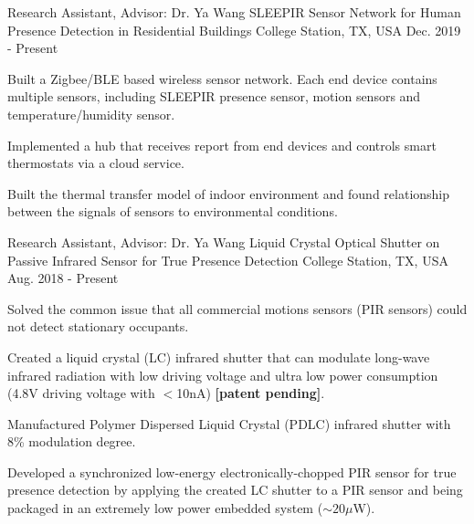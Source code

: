

\begin{cventries}

  \cventry
    {Research Assistant, Advisor: Dr. Ya Wang} %
    {SLEEPIR Sensor Network for Human Presence Detection in Residential Buildings} %
    {College Station, TX, USA} %
    {Dec. 2019 - Present} %
    {
      \begin{cvitems} %
        \item Built a Zigbee/BLE based wireless sensor network. Each end device contains multiple sensors, including SLEEPIR presence sensor, motion sensors and temperature/humidity sensor.
        \item Implemented a hub that receives report from end devices and controls smart thermostats via a cloud service.
        \item Built the thermal transfer model of indoor environment and found relationship between the signals of sensors to environmental conditions.
      \end{cvitems}
    }
  \cventry
    {Research Assistant, Advisor: Dr. Ya Wang} %
    {Liquid Crystal Optical Shutter on Passive Infrared Sensor for True Presence Detection} %
    {College Station, TX, USA} %
    {Aug. 2018 - Present} %
    {
      \begin{cvitems} %
        \item Solved the common issue that all commercial motions sensors (PIR sensors) could not detect stationary occupants.
        \item Created a liquid crystal (LC) infrared shutter that can modulate long-wave infrared radiation with low driving voltage and ultra low power consumption (4.8V driving voltage with $<$10nA) \textbf{[patent pending]}.
        \item Manufactured Polymer Dispersed Liquid Crystal (PDLC) infrared shutter with 8\% modulation degree.
        \item Developed a synchronized low-energy electronically-chopped PIR sensor for true presence detection by applying the created LC shutter to a PIR sensor and being packaged in an extremely low power embedded system ($\sim20\mu$W).

\end{cvitems}}
\end{cventries}

